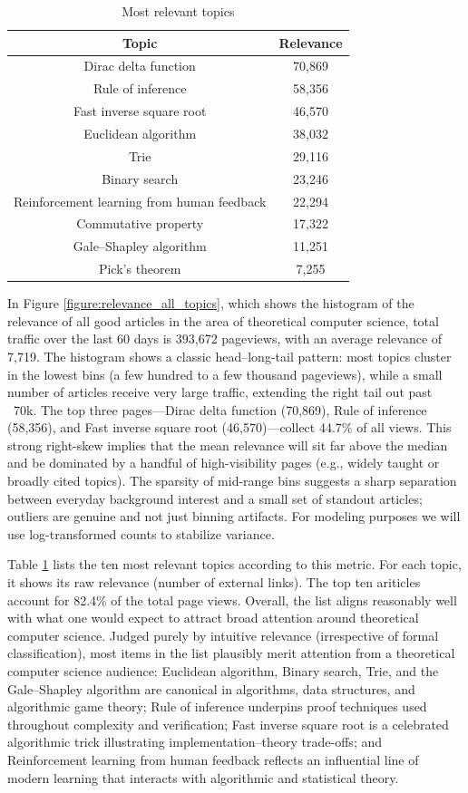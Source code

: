 \begin{table}
\begin{centering}
\begin{tabular}{|c|c|}
\hline 
Topic & Relevance \tabularnewline
\hline 
\hline 
Dirac delta function & 70,869 \tabularnewline
\hline 
Rule of inference & 58,356 \tabularnewline
\hline 
Fast inverse square root & 46,570 \tabularnewline
\hline 
Euclidean algorithm & 38,032 \tabularnewline
\hline 
Trie & 29,116 \tabularnewline
\hline 
Binary search & 23,246 \tabularnewline
\hline 
Reinforcement learning from human feedback & 22,294 \tabularnewline
\hline 
Commutative property & 17,322 \tabularnewline
\hline 
Gale–Shapley algorithm & 11,251 \tabularnewline
\hline 
Pick's theorem & 7,255 \tabularnewline
\hline 
\end{tabular}
\par\end{centering}
\caption{\label{tab:Most-Relevant-Topics}Most relevant topics}
\end{table}

In Figure \ref{figure:relevance_all_topics}, which shows the histogram of the relevance of all good articles in the area of theoretical computer science, total traffic over the last 60 days is 393,672 pageviews, with an average relevance of 7,719. The histogram shows a classic head–long-tail pattern: most topics cluster in the lowest bins (a few hundred to a few thousand pageviews), while a small number of articles receive very large traffic, extending the right tail out past ~70k. The top three pages—Dirac delta function (70,869), Rule of inference (58,356), and Fast inverse square root (46,570)—collect 44.7\% of all views. This strong right-skew implies that the mean relevance will sit far above the median and be dominated by a handful of high-visibility pages (e.g., widely taught or broadly cited topics). The sparsity of mid-range bins suggests a sharp separation between everyday background interest and a small set of standout articles; outliers are genuine and not just binning artifacts. For modeling purposes we will use log-transformed counts to stabilize variance.

Table \ref{tab:Most-Relevant-Topics} lists the ten most relevant topics according to this metric. For each topic, it shows its raw relevance (number of external links). The top ten ariticles account for 82.4\% of the total page views. Overall, the list aligns reasonably well with what one would expect to attract broad attention around theoretical computer science. Judged purely by intuitive relevance (irrespective of formal classification), most items in the list plausibly merit attention from a theoretical computer science audience: Euclidean algorithm, Binary search, Trie, and the Gale–Shapley algorithm are canonical in algorithms, data structures, and algorithmic game theory; Rule of inference underpins proof techniques used throughout complexity and verification; Fast inverse square root is a celebrated algorithmic trick illustrating implementation–theory trade-offs; and Reinforcement learning from human feedback reflects an influential line of modern learning that interacts with algorithmic and statistical theory.


